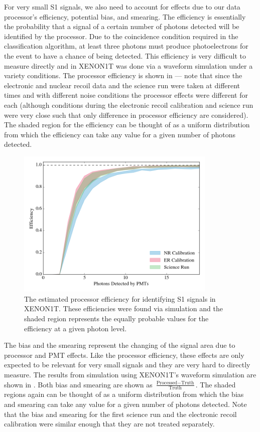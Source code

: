 For very small S1 signals, we also need to account for effects due to our data processor's efficiency, potential bias, and smearing.  The efficiency is essentially the probability that a signal of a certain number of photons detected will be identified by the processor.  Due to the coincidence condition required in the classification algorithm, at least three photons must produce photoelectrons for the event to have a chance of being detected.  This efficiency is very difficult to measure directly and in XENON1T was done via a waveform simulation under a variety conditions.  The processor efficiency is shown in  --- note that since the electronic and nuclear recoil data and the science run were taken at different times and with different noise conditions the processor effects were different for each (although conditions during the electronic recoil calibration and science run were very close such that only difference in processor efficiency are considered).  The shaded region for the efficiency can be thought of as a uniform distribution from which the efficiency can take any value for a given number of photons detected.


\begin{figure}[t]
        \centering
	\includegraphics[width=0.85\textwidth]{xe1t_pax_acceptance}
	\caption{The estimated processor efficiency for identifying S1 signals in XENON1T.  These efficiencies were found via simulation and the shaded region represents the equally probable values for the efficiency at a given photon level.}
	\label{fig:xe1t_pax_acceptance}
\end{figure}


The bias and the smearing represent the changing of the signal area due to processor and PMT effects.  Like the processor efficiency, these effects are only expected to be relevant for very small signals and they are very hard to directly measure.  The results from simulation using XENON1T's waveform simulation are shown in .  Both bias and smearing are shown as $\frac{\textrm{Processed} - \textrm{Truth}}{\textrm{Truth}}$.  The shaded regions again can be thought of as a uniform distribution from which the bias and smearing can take any value for a given number of photons detected.  Note that the bias and smearing for the first science run and the electronic recoil calibration were similar enough that they are not treated separately.

